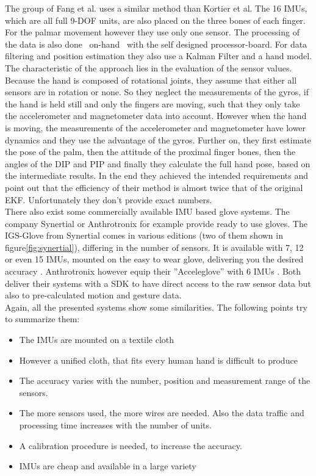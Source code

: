 The group of Fang et al. uses a similar method than Kortier et al. The 16 \acp{IMU}, which are all full 9-\ac{DOF} units, are also placed on the three bones of each finger. For the palmar movement however they use only one sensor. The processing of the data is also done ~\grqq on-hand\grqq~ with the self designed processor-board. For data filtering and position estimation they also use a Kalman Filter and a hand model. The characteristic of the approach lies in the evaluation of the sensor values. Because the hand is composed of rotational joints, they assume that either all sensors are in rotation or none. So they neglect the measurements of the gyros, if the hand is held still and only the fingers are moving, such that they only take the accelerometer and magnetometer data into account. However when the hand is moving, the measurements of the accelerometer and magnetometer have lower dynamics and they use the advantage of the gyros. Further on, they first estimate the pose of the palm, then the attitude of the proximal finger bones, then the angles of the DIP and PIP and finally they calculate the full hand pose, based on the intermediate results. In the end they achieved the intended requirements and point out that the efficiency of their method is almost twice that of the original \ac{EKF}. Unfortunately they don't provide exact numbers.\\
There also exist some commercially available \ac{IMU} based glove systems. The company Synertial or Anthrotronix for example provide ready to use gloves. The IGS-Glove from Synertial comes in various editions (two of them shown in figure\ref{fig:synertial}), differing in the number of sensors. It is available with 7, 12 or even 15 \acp{IMU}, mounted on the easy to wear glove, delivering you the desired accuracy \cite{Synertial}. Anthrotronix however equip their ''Acceleglove'' with 6 \acp{IMU} \cite{anthrotronix}. Both deliver their systems with a \acs{SDK} to have direct access to the raw sensor data but also to pre-calculated motion and gesture data.\\

Again, all the presented systems show some similarities. The following points try to summarize them:
\begin{itemize}
\item The \acp{IMU} are mounted on a textile cloth
\item However a unified cloth, that fits every human hand is difficult to produce
\item The accuracy varies with the number, position and measurement range of the sensors.
\item The more sensors used, the more wires are needed. Also the data traffic and processing time increases with the number of units.
\item A calibration procedure is needed, to increase the accuracy.
\item IMUs are cheap and available in a large variety
\end{itemize}

